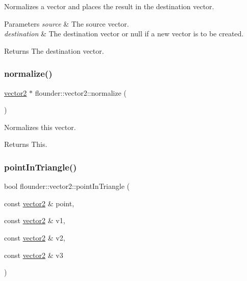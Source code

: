 Normalizes a vector and places the result in the destination vector. 


\begin{DoxyParams}{Parameters}
{\em source} & The source vector. \\
\hline
{\em destination} & The destination vector or null if a new vector is to be created. \\
\hline
\end{DoxyParams}
\begin{DoxyReturn}{Returns}
The destination vector. 
\end{DoxyReturn}
\mbox{\label{classflounder_1_1vector2_a6b47b4d4a39f7a3465e03ee74299ebbe}} 
\subsubsection{\texorpdfstring{normalize()}{normalize()}\hspace{0.1cm}{\footnotesize\ttfamily [2/2]}}
{\footnotesize\ttfamily \hyperlink{classflounder_1_1vector2}{vector2} $\ast$ flounder\+::vector2\+::normalize (\begin{DoxyParamCaption}{ }\end{DoxyParamCaption})}



Normalizes this vector. 

\begin{DoxyReturn}{Returns}
This. 
\end{DoxyReturn}
\mbox{\label{classflounder_1_1vector2_a99be81b66c5723b8a163046a07f55765}} 
\subsubsection{\texorpdfstring{point\+In\+Triangle()}{pointInTriangle()}}
{\footnotesize\ttfamily bool flounder\+::vector2\+::point\+In\+Triangle (\begin{DoxyParamCaption}\item[{const \hyperlink{classflounder_1_1vector2}{vector2} \&}]{point,  }\item[{const \hyperlink{classflounder_1_1vector2}{vector2} \&}]{v1,  }\item[{const \hyperlink{classflounder_1_1vector2}{vector2} \&}]{v2,  }\item[{const \hyperlink{classflounder_1_1vector2}{vector2} \&}]{v3 }\end{DoxyParamCaption})\hspace{0.3cm}{\ttfamily [static]}}



